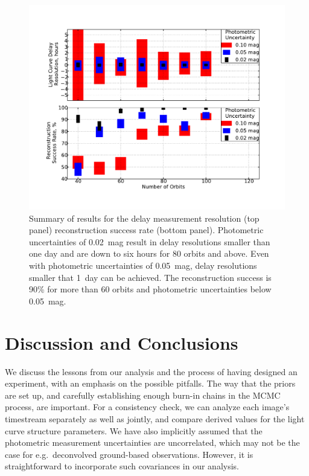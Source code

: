 \documentclass{emulateapj}
\begin{document}
\begin{figure}[t]
\begin{center}
\includegraphics[width=\linewidth]{./systematics_smy.pdf}
\caption{Summary of results for the delay measurement resolution (top
  panel) reconstruction success rate (bottom panel). Photometric
  uncertainties of 0.02~mag result in delay resolutions smaller than
  one day and are down to six hours for 80 orbits and above. Even with
  photometric uncertainties of 0.05~mag, delay resolutions smaller
  that 1~day can be achieved. The reconstruction success is 90\% for
  more than 60 orbits and photometric uncertainties below
  0.05~mag.}\label{fig:summary}
\end{center}
\end{figure}

\section{Discussion and Conclusions}\label{sec:discussion}

We discuss the lessons from our analysis and the process of having
designed an experiment, with an emphasis on the possible pitfalls. The
way that the priors are set up, and carefully establishing enough
burn-in chains in the MCMC process, are important.  For a consistency
check, we can analyze each image's timestream separately as well as
jointly, and compare derived values for the light curve structure
parameters. We have also implicitly assumed that the photometric
measurement uncertainties are uncorrelated, which may not be the case
for e.g.\ deconvolved ground-based observations. However, it is straightforward
to incorporate such covariances in our analysis. 
\end{document}
